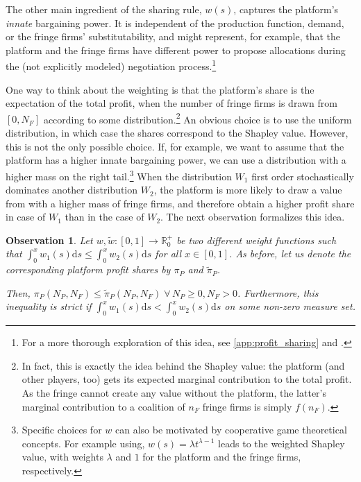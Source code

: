 \documentclass[a4paper]{article}
\newtheorem{observation}{Observation}
\newcommand{\ds}{\mathrm{d}s}
\begin{document}
The other main ingredient of the sharing rule, $w(s)$, captures the platform's \emph{innate} bargaining power.
It is independent of the production function, demand, or the fringe firms' substitutability, and might represent, for example, that the platform and the fringe firms have different power to propose allocations during the (not explicitly modeled) negotiation process.\footnote{
    For a more thorough exploration of this idea, see \cref{app:profit_sharing} and \textcite{hart1996bargaining}.
}

One way to think about the weighting is that the platform's share is the expectation of the total profit, when the number of fringe firms is drawn from $[0, N_F]$ according to some distribution.\footnote{
    In fact, this is exactly the idea behind the Shapley value: the platform (and other players, too) gets its expected marginal contribution to the total profit.
    As the fringe cannot create any value without the platform, the latter's marginal contribution to a coalition of $n_F$ fringe firms is simply $f(n_F)$.
}
An obvious choice is to use the uniform distribution, in which case the shares correspond to the Shapley value.
However, this is not the only possible choice.
If, for example, we want to assume that the platform has a higher innate bargaining power, we can use a distribution with a higher mass on the right tail.\footnote{
    Specific choices for $w$ can also be motivated by cooperative game theoretical concepts.
    For example using, $w(s) = \lambda t^{\lambda - 1}$ leads to the weighted Shapley value, with weights $\lambda$ and $1$ for the platform and the fringe firms, respectively.
}
When the distribution $W_1$ first order stochastically dominates another distribution $W_2$, the platform is more likely to draw a value from with a higher mass of fringe firms, and therefore obtain a higher profit share in case of $W_1$ than in the case of $W_2$.
The next observation formalizes this idea.
\begin{observation}
    \label{prop:innate_bargaining_power}
    Let $w, \tilde{w}: [0, 1] \to \mathbb{R}_0^+$ be two different weight functions such that $\int_0^x w_1(s) \ds \leq \int_0^x w_2(s) \ds$ for all $x \in [0, 1]$.
    As before, let us denote the corresponding platform profit shares by $\pi_P$ and $\tilde{\pi}_P$.
    
    Then, $\pi_P(N_P, N_F) \leq \tilde{\pi}_P(N_P, N_F) \; \forall\, N_P \geq 0, N_F > 0$.
    Furthermore, this inequality is strict if $\int_0^x w_1(s) \ds < \int_0^x w_2(s) \ds$ on some non-zero measure set.
\end{observation}
\end{document}
